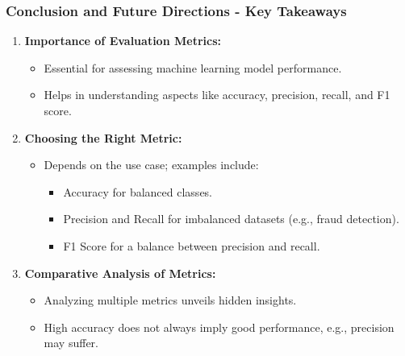 \documentclass[aspectratio=169]{beamer}
\begin{document}
\begin{frame}[fragile]
    \frametitle{Conclusion and Future Directions - Key Takeaways}
    \begin{enumerate}
        \item \textbf{Importance of Evaluation Metrics:}
        \begin{itemize}
            \item Essential for assessing machine learning model performance.
            \item Helps in understanding aspects like accuracy, precision, recall, and F1 score.
        \end{itemize}
        
        \item \textbf{Choosing the Right Metric:}
        \begin{itemize}
            \item Depends on the use case; examples include:
            \begin{itemize}
                \item Accuracy for balanced classes.
                \item Precision and Recall for imbalanced datasets (e.g., fraud detection).
                \item F1 Score for a balance between precision and recall.
            \end{itemize}
        \end{itemize}

        \item \textbf{Comparative Analysis of Metrics:}
        \begin{itemize}
            \item Analyzing multiple metrics unveils hidden insights.
            \item High accuracy does not always imply good performance, e.g., precision may suffer.
        \end{itemize}
    \end{enumerate}
\end{frame}
\end{document}
